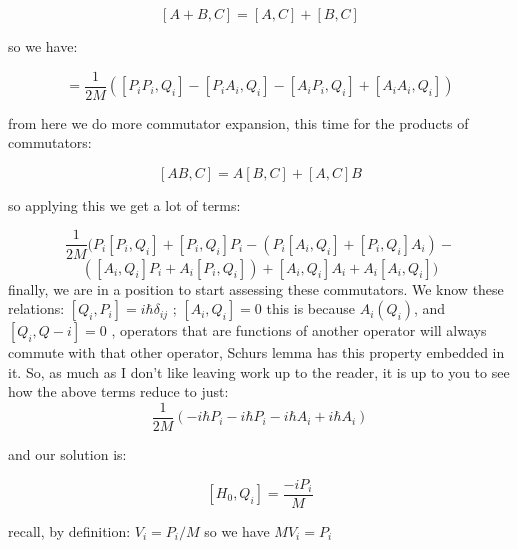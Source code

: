 \documentclass[11pt, letterpaper]{article}
\begin{document}
\[[A+B,C]=[A,C]+[B,C]\]

so we have:

\[=\frac{1}{2M}([P_iP_i,Q_i]-[P_iA_i,Q_i]-[A_iP_i,Q_i]+[A_iA_i,Q_i])\]

from here we do more commutator expansion, this time for the products of commutators:

\[[AB,C]=A[B,C]+[A,C]B\]

so applying this we get a lot of terms:

\[\frac{1}{2M}(P_i[P_i,Q_i]+[P_i,Q_i]P_i - (P_i[A_i,Q_i]+[P_i,Q_i]A_i)-\]
\[([A_i,Q_i]P_i + A_i[P_i,Q_i]) + [A_i,Q_i]A_i + A_i[A_i,Q_i])\]
finally, we are in a position to start assessing these commutators. We know these relations:
\([Q_i,P_i]=i\hbar\delta_{ij}\) ; \([A_i,Q_i]=0\) this is because \(A_i(Q_i)\), and \([Q_i,Q-i]=0\) , operators that are functions of another operator will always commute with that other operator, Schurs lemma has this property embedded in it. So, as much as I don't like leaving work up to the reader, it is up to you to see how the above terms reduce to just:
\[\frac{1}{2M}(-i\hbar{}P_i-i\hbar{}P_i-i\hbar{}A_i+i\hbar{}A_i)\]

and our solution is:

\[[H_0,Q_i]=\frac{-iP_i}{M}\]

recall, by definition:
\(V_i=P_i/M\) so  we have \(MV_i=P_i\)
\end{document}
